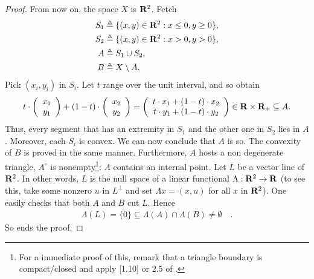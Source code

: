 \begin{proof}
%
From now on, the space $X$ is ${\mathbf R}^2$. Fetch %
%
   \begin{align}
     S_1 & \triangleq \{(x, y )\in {\mathbf R}^2: x\leq 0, y \geq 0\}, \\
     S_2 & \triangleq \{(x, y )\in {\mathbf R}^2: x>0, y > 0\}, \\
     A   & \triangleq S_1\cup S_2, \\
     B   & \triangleq X\setminus A.
   \end{align}
%
Pick $(x_i, y_i)$ in $S_i$. %
Let $t$ range over the unit interval, and so obtain %
%
  \begin{align}
    t\cdot  \left(\begin{array}{c}x_1 \\y_1\end{array}\right)+
    (1-t)  \cdot \left(\begin{array}{c}x_2 \\ y_2\end{array}\right)= 
    \left(\begin{array}{c}t\cdot x_1+(1-t)\cdot x_2 \\t\cdot y_1 + (1-t)\cdot y_2\end{array}\right)
    \in {\mathbf R}\times {\mathbf R}_+\subseteq A.
  \end{align}
%
Thus, every segment that has an extremity in $S_1$ and the other one in $S_2$ %
lies in $A$. %
Moreover, each $S_i$ is convex. We can now conclude that $A$ is so. %
The convexity of $B$ is proved in the same manner. Furthermore, %
$A$ hosts a non degenerate triangle, \ie $A^{\circ}$ is nonempty\footnote{%
%
  For a immediate proof of this, remark that a triangle boundary is %
  compact/closed and apply [1.10] or 2.5 of \cite{BigRudin}.
}: %
$A$ contains an internal point. %
%
\newline\newline\noindent
%
Let $L$ be a vector line of ${\mathbf R}^2$. %
In other words, $L$ is the null space of a linear functional %
%
  $\Lambda: {\mathbf R}^2\to {\mathbf R}$ %
%
(to see this, take some nonzero $u$ in $L^\bot$ and set %
%
  $\Lambda x= (x,u)$ %
%
for all $x$ in ${\mathbf R}^2$). One easily checks that both $A$ and $B$ cut $L$. %
Hence %
%
  \begin{align}
    \Lambda (L)=\{0\}\subseteq \Lambda (A)\cap \Lambda (B)\neq\emptyset\quad.
    \end{align}
%
So ends the proof.
\end{proof}
